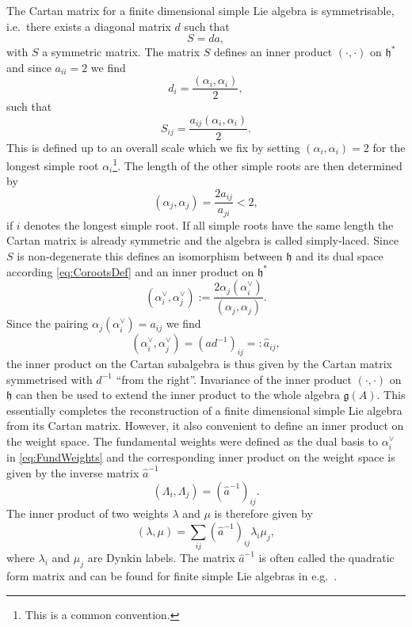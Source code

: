 The Cartan matrix for a finite dimensional simple Lie algebra is symmetrisable, i.e.\ there exists a diagonal matrix $d$ such that 
\begin{equation}
    S = da,
\end{equation}
with $S$ a symmetric matrix. The matrix $S$ defines an inner product $(\cdot,\cdot)$ on $\mathfrak{h}^*$ and since $a_{ii}=2$ we find
\begin{equation}
    d_i = \frac{(\alpha_i,\alpha_i)}{2},
\end{equation}
such that 
\begin{equation}
    S_{ij} = \frac{a_{ij}(\alpha_i,\alpha_i)}{2}.
\end{equation}
This is defined up to an overall scale which we fix by setting $(\alpha_i,\alpha_i)=2$ for the longest simple root $\alpha_i$\footnote{This is a common convention.}. The length of the other simple roots are then determined by 
\begin{equation}
    (\alpha_j,\alpha_j) = \frac{2a_{ij}}{a_{ji}}< 2,
\end{equation}
if $i$ denotes the longest simple root. If all simple roots have the same length the Cartan matrix is already symmetric and the algebra is called simply-laced. Since $S$ is non-degenerate this defines an isomorphism between $\mathfrak{h}$ and its dual space according \eqref{eq:CorootsDef} and an inner product on $\mathfrak{h}^*$
\begin{equation}
    (\alpha_i^\vee,\alpha_j^\vee) := \frac{2\alpha_j(\alpha_i^\vee)}{(\alpha_j,\alpha_j)}.
\end{equation}
Since the pairing $\alpha_j(\alpha_i^\vee)=a_{ij}$ we find 
\begin{equation}
    (\alpha_i^\vee,\alpha_j^\vee) = (ad^{-1})_{ij} =: \hat{a}_{ij},
\end{equation}
the inner product on the Cartan subalgebra is thus given by the Cartan matrix symmetrised with $d^{-1}$ ``from the right''. Invariance of the inner product $(\cdot,\cdot)$ on $\mathfrak{h}$ can then be used to extend the inner product to the whole algebra $\mathfrak{g}(A)$. This essentially completes the reconstruction of a finite dimensional simple Lie algebra from its Cartan matrix. However, it also convenient to define an inner product on the weight space. The fundamental weights were defined as the dual basis to $\alpha^\vee_i$ in \eqref{eq:FundWeights} and the corresponding inner product on the weight space is given by the inverse matrix $\hat{a}^{-1}$ 
\begin{equation}
    (\Lambda_i,\Lambda_j) = (\hat{a}^{-1})_{ij}.
\end{equation}
The inner product of two weights $\lambda$ and $\mu$ is therefore given by 
\begin{equation}
    (\lambda,\mu) = \sum_{ij}(\hat{a}^{-1})_{ij}\lambda_i\mu_j,
\end{equation}
where $\lambda_i$ and $\mu_j$ are Dynkin labels. The matrix $\hat{a}^{-1}$ is often called the quadratic form matrix and can be found for finite simple Lie algebras in e.g.\ \cite{Fuchs1997}. 


